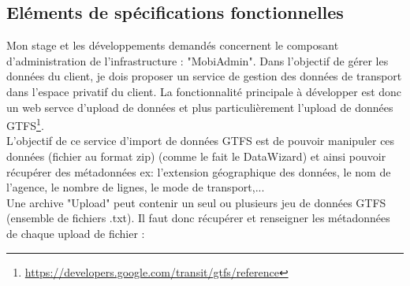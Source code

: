 \subsection{Eléments de spécifications fonctionnelles}

Mon stage et les développements demandés concernent le composant d'administration de l'infrastructure : "MobiAdmin". Dans l'objectif de gérer les données du client, je dois proposer un service de gestion des données de transport dans l’espace privatif du client.
La fonctionnalité principale à développer est donc un web servce d'upload de données et plus particulièrement l'upload de données GTFS\footnote{\url{https://developers.google.com/transit/gtfs/reference}}.\\ 

L'objectif de ce service d'import de données GTFS est de pouvoir manipuler ces données (fichier au format zip) (comme le fait le DataWizard) et ainsi pouvoir récupérer des métadonnées ex: l'extension géographique des données, le nom de l'agence, le nombre de lignes, le mode de transport,...\\
Une archive "Upload" peut contenir un seul ou plusieurs jeu de données GTFS (ensemble de fichiers .txt). Il faut donc récupérer et renseigner les métadonnées de chaque upload de fichier :
